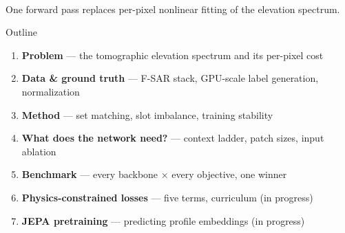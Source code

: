 \begin{frame}[plain]
  \titlepage
  \vspace{-1.2em}
  \centering
  \\[2pt]
  {\scriptsize One forward pass replaces per-pixel nonlinear fitting of the elevation spectrum.}
\end{frame}

\begin{frame}{Outline}
  \small
  \begin{enumerate}
    \item \textbf{Problem} --- the tomographic elevation spectrum and its per-pixel cost
    \item \textbf{Data \& ground truth} --- F-SAR stack, GPU-scale label generation, normalization
    \item \textbf{Method} --- set matching, slot imbalance, training stability
    \item \textbf{What does the network need?} --- context ladder, patch sizes, input ablation
    \item \textbf{Benchmark} --- every backbone $\times$ every objective, one winner
    \item \textbf{Physics-constrained losses} --- five terms, curriculum \hfill {\color{soft}(in progress)}
    \item \textbf{JEPA pretraining} --- predicting profile embeddings \hfill {\color{soft}(in progress)}
  \end{enumerate}
\end{frame}
